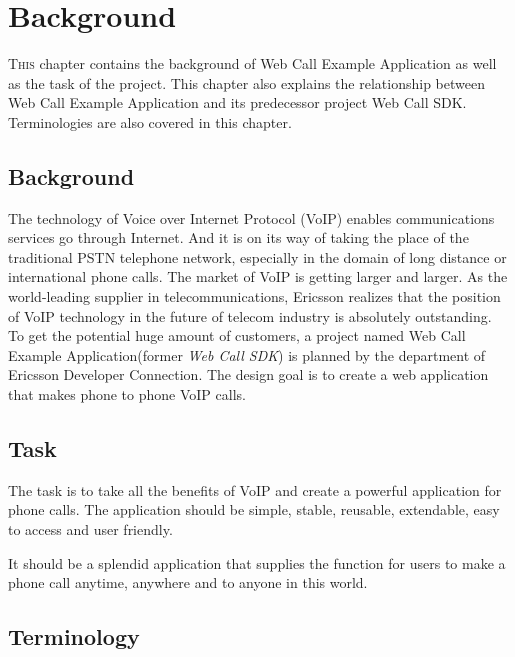 \chapter{Background}
\label{sec:Background}

\lettrine[lines=3]{T}{his} chapter contains the background of \textsf{Web Call Example Application} as well as the task of the project. This chapter also explains the relationship between Web Call Example Application and its predecessor project \textsf{Web Call SDK}. Terminologies are also covered in this chapter.  

\section{Background}
\label{sec:Background:Background}

The technology of Voice over Internet Protocol (VoIP) enables communications services go through Internet. And it is on its way of taking the place of the traditional PSTN telephone network, especially in the domain of long distance or international phone calls. The market of VoIP is getting larger and larger. As the world-leading supplier in telecommunications, Ericsson realizes that the position of VoIP technology in the future of telecom industry is absolutely outstanding. To get the potential huge amount of customers, a project named Web Call Example Application(former \textit{Web Call SDK}) is planned by the department of Ericsson Developer Connection. The design goal is to create a web application that makes phone to phone VoIP calls. 

\section{Task}
\label{sec:Introduction:Task}

The task is to take all the benefits of VoIP and create a powerful application for phone calls. The application should be simple, stable, reusable, extendable, easy to access and user friendly. 

It should be a splendid application that supplies the function for users to make a phone call anytime, anywhere and to anyone in this world.



\section{Terminology}
\label{sec:Terminology}


